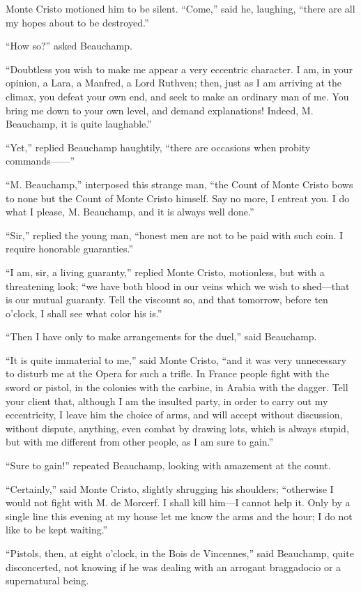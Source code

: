 Monte Cristo motioned him to be silent. “Come,” said he, laughing,
“there are all my hopes about to be destroyed.”

“How so?” asked Beauchamp.

“Doubtless you wish to make me appear a very eccentric character. I am,
in your opinion, a Lara, a Manfred, a Lord Ruthven; then, just as I am
arriving at the climax, you defeat your own end, and seek to make an
ordinary man of me. You bring me down to your own level, and demand
explanations! Indeed, M. Beauchamp, it is quite laughable.”

“Yet,” replied Beauchamp haughtily, “there are occasions when probity
commands——”

“M. Beauchamp,” interposed this strange man, “the Count of Monte Cristo
bows to none but the Count of Monte Cristo himself. Say no more, I
entreat you. I do what I please, M. Beauchamp, and it is always well
done.”

“Sir,” replied the young man, “honest men are not to be paid with such
coin. I require honorable guaranties.”

“I am, sir, a living guaranty,” replied Monte Cristo, motionless, but
with a threatening look; “we have both blood in our veins which we wish
to shed—that is our mutual guaranty. Tell the viscount so, and that
tomorrow, before ten o’clock, I shall see what color his is.”

“Then I have only to make arrangements for the duel,” said Beauchamp.

“It is quite immaterial to me,” said Monte Cristo, “and it was very
unnecessary to disturb me at the Opera for such a trifle. In France
people fight with the sword or pistol, in the colonies with the
carbine, in Arabia with the dagger. Tell your client that, although I
am the insulted party, in order to carry out my eccentricity, I leave
him the choice of arms, and will accept without discussion, without
dispute, anything, even combat by drawing lots, which is always stupid,
but with me different from other people, as I am sure to gain.”

“Sure to gain!” repeated Beauchamp, looking with amazement at the
count.

“Certainly,” said Monte Cristo, slightly shrugging his shoulders;
“otherwise I would not fight with M. de Morcerf. I shall kill him—I
cannot help it. Only by a single line this evening at my house let me
know the arms and the hour; I do not like to be kept waiting.”

“Pistols, then, at eight o’clock, in the Bois de Vincennes,” said
Beauchamp, quite disconcerted, not knowing if he was dealing with an
arrogant braggadocio or a supernatural being.


